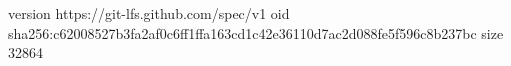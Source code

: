 version https://git-lfs.github.com/spec/v1
oid sha256:c62008527b3fa2af0c6ff1ffa163cd1c42e36110d7ac2d088fe5f596c8b237bc
size 32864
